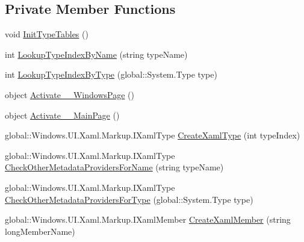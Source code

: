 \subsection*{Private Member Functions}
\begin{CompactItemize}
\item 
void \hyperlink{class__2doo_1_1_u_w_p_1_1__2doo___u_w_p___xaml_type_info_1_1_xaml_type_info_provider_c73716b00fa88a12511d02e8aa25c234}{InitTypeTables} ()
\item 
int \hyperlink{class__2doo_1_1_u_w_p_1_1__2doo___u_w_p___xaml_type_info_1_1_xaml_type_info_provider_f71ffe651a43f8224607ddc108668357}{LookupTypeIndexByName} (string typeName)
\item 
int \hyperlink{class__2doo_1_1_u_w_p_1_1__2doo___u_w_p___xaml_type_info_1_1_xaml_type_info_provider_9d1d022c3abd15134c32ab1100b2fdc6}{LookupTypeIndexByType} (global::System.Type type)
\item 
object \hyperlink{class__2doo_1_1_u_w_p_1_1__2doo___u_w_p___xaml_type_info_1_1_xaml_type_info_provider_e94d530fae5a300f492f6fb2e7ef4773}{Activate\_\_\-WindowsPage} ()
\item 
object \hyperlink{class__2doo_1_1_u_w_p_1_1__2doo___u_w_p___xaml_type_info_1_1_xaml_type_info_provider_8155049418f180c1fa65dc0de23326a4}{Activate\_\_\-MainPage} ()
\item 
global::Windows.UI.Xaml.Markup.IXamlType \hyperlink{class__2doo_1_1_u_w_p_1_1__2doo___u_w_p___xaml_type_info_1_1_xaml_type_info_provider_1006eb0b6ffa687ece81f28915b7827a}{CreateXamlType} (int typeIndex)
\item 
global::Windows.UI.Xaml.Markup.IXamlType \hyperlink{class__2doo_1_1_u_w_p_1_1__2doo___u_w_p___xaml_type_info_1_1_xaml_type_info_provider_4cde10ba535f796606055361f670e908}{CheckOtherMetadataProvidersForName} (string typeName)
\item 
global::Windows.UI.Xaml.Markup.IXamlType \hyperlink{class__2doo_1_1_u_w_p_1_1__2doo___u_w_p___xaml_type_info_1_1_xaml_type_info_provider_32f11282d6a3d2365640c91e58ba15da}{CheckOtherMetadataProvidersForType} (global::System.Type type)
\item 
global::Windows.UI.Xaml.Markup.IXamlMember \hyperlink{class__2doo_1_1_u_w_p_1_1__2doo___u_w_p___xaml_type_info_1_1_xaml_type_info_provider_a54d549bb3ab97a5fa9525ad7c516602}{CreateXamlMember} (string longMemberName)
\end{CompactItemize}
